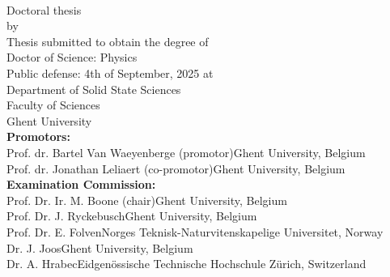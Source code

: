\thispagestyle{empty}
\noindent

\fontsize{12pt}{14pt}\selectfont

\vspace*{-3cm}
\noindent{}
\vspace{2cm}
\fontsize{22pt}{22pt}\selectfont
\begin{center}
{\textsc{\phdtitle}}\\
\end{center}

\fontsize{14pt}{16pt}\selectfont

\null\hfill Doctoral thesis\\
\null\hfill by \phdauthor\\
\vfill
{}
\fontsize{12pt}{14pt}\selectfont
Thesis submitted to obtain the degree of\\
Doctor of Science: Physics\\
\newline
Public defense: 4th of September, 2025 at\\
Department of Solid State Sciences\\
Faculty of Sciences\\
Ghent University\\


\textbf{Promotors:}\\
Prof. dr. Bartel Van Waeyenberge (promotor)\hfill Ghent University, Belgium\\
Prof. dr. Jonathan Leliaert (co-promotor)\hfill Ghent University, Belgium\\
\newline
\textbf{Examination Commission:}\\
Prof. Dr. Ir. M. Boone (chair)\hfill Ghent University, Belgium\\
Prof. Dr. J. Ryckebusch\hfill Ghent University, Belgium\\
Prof. Dr. E. Folven\hfill Norges Teknisk-Naturvitenskapelige Universitet, Norway\\%
Dr. J. Joos\hfill Ghent University, Belgium\\
Dr. A. Hrabec\hfill Eidgen\"ossische Technische Hochschule Z\"urich, Switzerland\\%

\newpage
